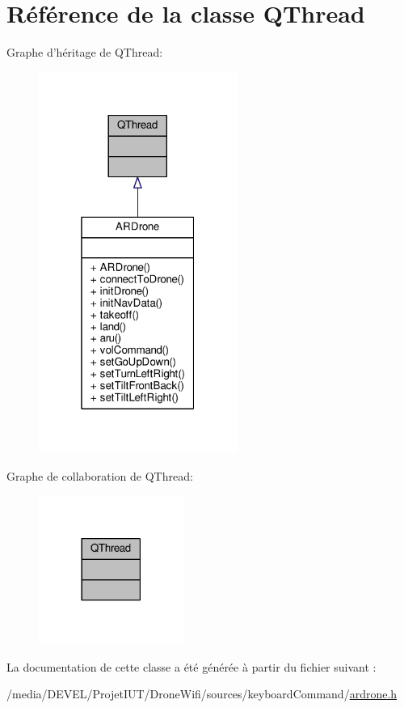 \hypertarget{class_q_thread}{\section{Référence de la classe Q\-Thread}
\label{class_q_thread}
}


Graphe d'héritage de Q\-Thread\-:
\nopagebreak
\begin{figure}[H]
\begin{center}
\leavevmode
\includegraphics[width=184pt]{class_q_thread__inherit__graph}
\end{center}
\end{figure}


Graphe de collaboration de Q\-Thread\-:
\nopagebreak
\begin{figure}[H]
\begin{center}
\leavevmode
\includegraphics[width=134pt]{class_q_thread__coll__graph}
\end{center}
\end{figure}


La documentation de cette classe a été générée à partir du fichier suivant \-:\begin{DoxyCompactItemize}
\item 
/media/\-D\-E\-V\-E\-L/\-Projet\-I\-U\-T/\-Drone\-Wifi/sources/keyboard\-Command/\hyperlink{ardrone_8h}{ardrone.\-h}\end{DoxyCompactItemize}
